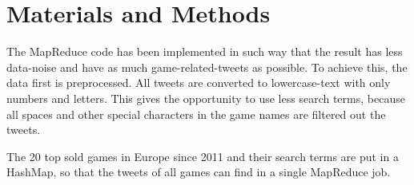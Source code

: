 \section{Materials and Methods}
The MapReduce code has been implemented in such way that the result has less data-noise and have as much game-related-tweets as possible. To achieve this, the data first is preprocessed. All tweets are converted to lowercase-text with only numbers and letters. This gives the opportunity to use less search terms, because all spaces and other special characters in the game names are filtered out the tweets. 


The 20 top sold games in Europe since 2011 and their search terms are put in a HashMap, so that the tweets of all games can find in a single MapReduce job.
  